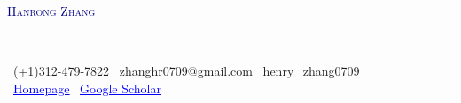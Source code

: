 \documentclass[letterpaper,11pt]{article}
\begin{document}

\begin{center}
    {\Huge \scshape \textcolor{navy}{Hanrong Zhang}} \\ \vspace{2pt}
    {\color{navy}\rule{0.5\textwidth}{0.6pt}} \\ \vspace{4pt}
    \small \faPhone\, (+1)312-479-7822 \quad
    \small \faEnvelope\, {zhanghr0709@gmail.com} \quad
    \small \faWeixin\, {henry\_zhang0709} \\ \vspace{2pt}
    \small \faGlobe\, \href{https://zhang-henry.github.io}{\textcolor{blue}{\underline{Homepage}}}
    \quad
    \small \faGraduationCap\, \href{https://scholar.google.com/citations?user=qG5_O40AAAAJ&hl=zh-CN}{\textcolor{blue}{\underline{Google Scholar}}}

\end{center}



\end{document}
